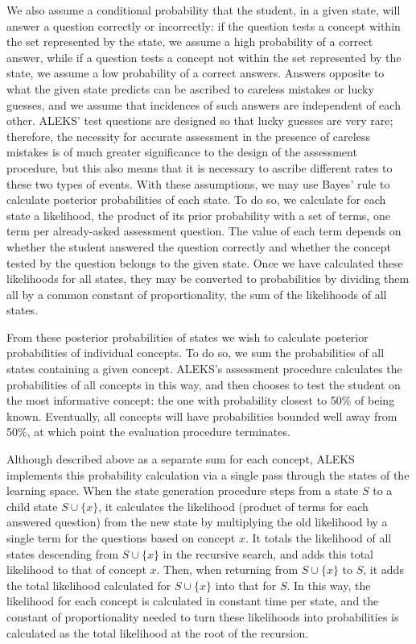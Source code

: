 \documentclass[11pt]{llncs}
\begin{document}
{We also assume a conditional probability that the student, in a given state, will answer a question correctly or incorrectly: if the question tests a concept within the set represented by the state, we assume a high probability of a correct answer, while if a question tests a concept not within the set represented by the state, we assume a low probability of a correct answers.
Answers opposite to what the given state predicts can be ascribed to careless mistakes or lucky guesses, and we assume that incidences of such answers are independent of each other. ALEKS' test questions are designed so that lucky guesses are very rare; therefore, the necessity for accurate assessment in the presence of careless mistakes is of much greater significance to the design of the assessment procedure, but this also means that it is necessary to ascribe different rates to these two types of events. With these assumptions, we may use Bayes' rule to calculate posterior probabilities of each state. To do so, we calculate for each state a likelihood, the product of its prior probability with a set of terms, one term per already-asked assessment question. The value of each term depends on whether the student answered the question correctly and whether the concept tested by the question belongs to the given state. Once we have calculated these likelihoods for all states, they may be converted to probabilities by dividing them all by a common constant of proportionality, the sum of the likelihoods of all states.

From these posterior probabilities of states we wish to calculate posterior probabilities of individual concepts. To do so, we sum the probabilities of all states containing a given concept. ALEKS's assessment procedure calculates the probabilities of all concepts in this way, and then chooses to test the student on the most informative concept: the one with probability closest to 50\% of being known. Eventually, all concepts will have probabilities bounded well away from 50\%, at which point the evaluation procedure terminates.

Although described above as a separate sum for each concept,
ALEKS implements this probability calculation via a single pass through the states of the learning space. When the state generation procedure steps from a state $S$ to a child state $S\cup\{x\}$, it calculates the likelihood (product of terms for each answered question) from the new state by multiplying the old likelihood by a single term for the questions based on concept $x$. It totals the likelihood of all states descending from $S\cup\{x\}$ in the recursive search, and adds this total likelihood to that of concept $x$. Then, when returning from $S\cup\{x\}$ to $S$, it adds the total likelihood calculated for $S\cup\{x\}$ into that for $S$. In this way, the likelihood for each concept is calculated in constant time per state, and the constant of proportionality needed to turn these likelihoods into probabilities is calculated as the total likelihood at the root of the recursion.

}
\end{document}
